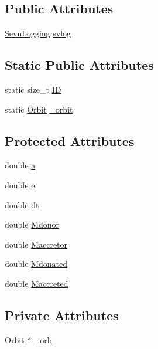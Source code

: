 \subsection*{Public Attributes}
\begin{DoxyCompactItemize}
\item 
\hyperlink{classsevnstd_1_1_sevn_logging}{Sevn\+Logging} \hyperlink{class_orbit_a94df5f96ea2e36d103890a07c1ae37cd}{svlog}
\end{DoxyCompactItemize}
\subsection*{Static Public Attributes}
\begin{DoxyCompactItemize}
\item 
static size\+\_\+t \hyperlink{class_orbit_a9ba4bbc8c22bfc30e9354969fd636f01}{ID}
\item 
static \hyperlink{class_orbit}{Orbit} \hyperlink{class_orbit_ac3423be9e8290c03b5656e9a09786f17}{\+\_\+orbit}
\end{DoxyCompactItemize}
\subsection*{Protected Attributes}
\begin{DoxyCompactItemize}
\item 
double \hyperlink{class_orbit_a80f7d9179bd6ca0be8cf8c4b8f06c88e}{a}
\item 
double \hyperlink{class_orbit_a9df1de9d5dd95a0906c1e513b466b938}{e}
\item 
double \hyperlink{class_orbit_a40917c9037224201ff4daba480226f9c}{dt}
\item 
double \hyperlink{class_orbit_ae629e67aa33a7a8cb1c06337a725edcc}{Mdonor}
\item 
double \hyperlink{class_orbit_a1cc1d33e07ab2043da69378ddc726950}{Maccretor}
\item 
double \hyperlink{class_orbit_a7ea0a5a0e3b8c3d88409d000326da464}{Mdonated}
\item 
double \hyperlink{class_orbit_aa4d454368d196b966e532205f182755a}{Maccreted}
\end{DoxyCompactItemize}
\subsection*{Private Attributes}
\begin{DoxyCompactItemize}
\item 
\hyperlink{class_orbit}{Orbit} $\ast$ \hyperlink{class_orbit_a7a6992542c4bdfa762d04ebbe68465a4}{\+\_\+orb}
\end{DoxyCompactItemize}
